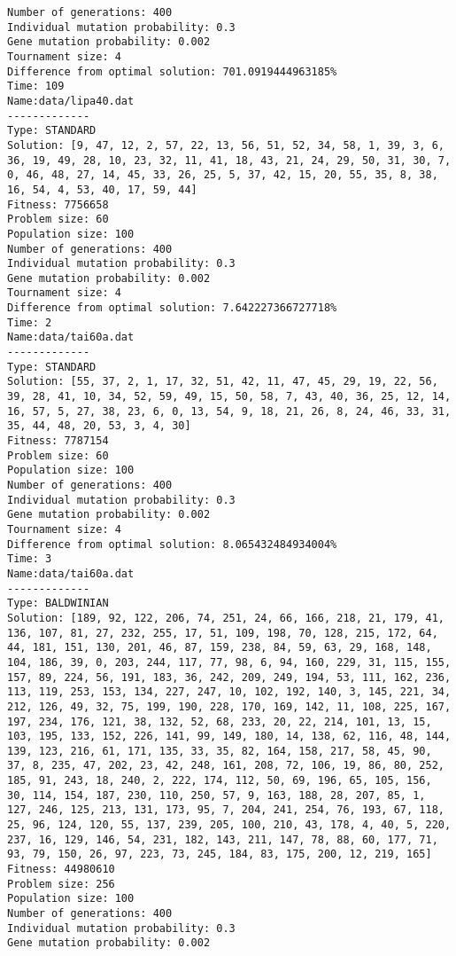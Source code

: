 \begin{lstlisting}
Number of generations: 400
Individual mutation probability: 0.3
Gene mutation probability: 0.002
Tournament size: 4
Difference from optimal solution: 701.0919444963185%
Time: 109
Name:data/lipa40.dat
-------------
Type: STANDARD
Solution: [9, 47, 12, 2, 57, 22, 13, 56, 51, 52, 34, 58, 1, 39, 3, 6, 36, 19, 49, 28, 10, 23, 32, 11, 41, 18, 43, 21, 24, 29, 50, 31, 30, 7, 0, 46, 48, 27, 14, 45, 33, 26, 25, 5, 37, 42, 15, 20, 55, 35, 8, 38, 16, 54, 4, 53, 40, 17, 59, 44]
Fitness: 7756658
Problem size: 60
Population size: 100
Number of generations: 400
Individual mutation probability: 0.3
Gene mutation probability: 0.002
Tournament size: 4
Difference from optimal solution: 7.642227366727718%
Time: 2
Name:data/tai60a.dat
-------------
Type: STANDARD
Solution: [55, 37, 2, 1, 17, 32, 51, 42, 11, 47, 45, 29, 19, 22, 56, 39, 28, 41, 10, 34, 52, 59, 49, 15, 50, 58, 7, 43, 40, 36, 25, 12, 14, 16, 57, 5, 27, 38, 23, 6, 0, 13, 54, 9, 18, 21, 26, 8, 24, 46, 33, 31, 35, 44, 48, 20, 53, 3, 4, 30]
Fitness: 7787154
Problem size: 60
Population size: 100
Number of generations: 400
Individual mutation probability: 0.3
Gene mutation probability: 0.002
Tournament size: 4
Difference from optimal solution: 8.065432484934004%
Time: 3
Name:data/tai60a.dat
-------------
Type: BALDWINIAN
Solution: [189, 92, 122, 206, 74, 251, 24, 66, 166, 218, 21, 179, 41, 136, 107, 81, 27, 232, 255, 17, 51, 109, 198, 70, 128, 215, 172, 64, 44, 181, 151, 130, 201, 46, 87, 159, 238, 84, 59, 63, 29, 168, 148, 104, 186, 39, 0, 203, 244, 117, 77, 98, 6, 94, 160, 229, 31, 115, 155, 157, 89, 224, 56, 191, 183, 36, 242, 209, 249, 194, 53, 111, 162, 236, 113, 119, 253, 153, 134, 227, 247, 10, 102, 192, 140, 3, 145, 221, 34, 212, 126, 49, 32, 75, 199, 190, 228, 170, 169, 142, 11, 108, 225, 167, 197, 234, 176, 121, 38, 132, 52, 68, 233, 20, 22, 214, 101, 13, 15, 103, 195, 133, 152, 226, 141, 99, 149, 180, 14, 138, 62, 116, 48, 144, 139, 123, 216, 61, 171, 135, 33, 35, 82, 164, 158, 217, 58, 45, 90, 37, 8, 235, 47, 202, 23, 42, 248, 161, 208, 72, 106, 19, 86, 80, 252, 185, 91, 243, 18, 240, 2, 222, 174, 112, 50, 69, 196, 65, 105, 156, 30, 114, 154, 187, 230, 110, 250, 57, 9, 163, 188, 28, 207, 85, 1, 127, 246, 125, 213, 131, 173, 95, 7, 204, 241, 254, 76, 193, 67, 118, 25, 96, 124, 120, 55, 137, 239, 205, 100, 210, 43, 178, 4, 40, 5, 220, 237, 16, 129, 146, 54, 231, 182, 143, 211, 147, 78, 88, 60, 177, 71, 93, 79, 150, 26, 97, 223, 73, 245, 184, 83, 175, 200, 12, 219, 165]
Fitness: 44980610
Problem size: 256
Population size: 100
Number of generations: 400
Individual mutation probability: 0.3
Gene mutation probability: 0.002

\end{lstlisting}
